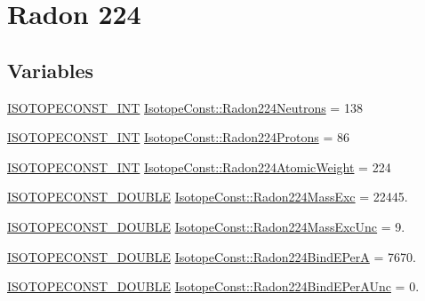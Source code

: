 \hypertarget{group___isotope_const-_radon-_rn224}{}\section{Radon 224}
\label{group___isotope_const-_radon-_rn224}
\subsection*{Variables}
\begin{DoxyCompactItemize}
\item 
\mbox{\hyperlink{group___isotope_const-_macros_ga5f18360b3e99483a35c32d789e62621c}{I\+S\+O\+T\+O\+P\+E\+C\+O\+N\+S\+T\+\_\+\+I\+NT}} \mbox{\hyperlink{group___isotope_const-_radon-_rn224_ga6cb3873adc7e7a927e28786b482a9480}{Isotope\+Const\+::\+Radon224\+Neutrons}} = 138
\item 
\mbox{\hyperlink{group___isotope_const-_macros_ga5f18360b3e99483a35c32d789e62621c}{I\+S\+O\+T\+O\+P\+E\+C\+O\+N\+S\+T\+\_\+\+I\+NT}} \mbox{\hyperlink{group___isotope_const-_radon-_rn224_ga3c0185f2e5d785e3fde9c56ef51a2580}{Isotope\+Const\+::\+Radon224\+Protons}} = 86
\item 
\mbox{\hyperlink{group___isotope_const-_macros_ga5f18360b3e99483a35c32d789e62621c}{I\+S\+O\+T\+O\+P\+E\+C\+O\+N\+S\+T\+\_\+\+I\+NT}} \mbox{\hyperlink{group___isotope_const-_radon-_rn224_gabebc509376c2696899d865a64b8c2c82}{Isotope\+Const\+::\+Radon224\+Atomic\+Weight}} = 224
\item 
\mbox{\hyperlink{group___isotope_const-_macros_ga8f45a7272ce02c0b4c65c44636ed719a}{I\+S\+O\+T\+O\+P\+E\+C\+O\+N\+S\+T\+\_\+\+D\+O\+U\+B\+LE}} \mbox{\hyperlink{group___isotope_const-_radon-_rn224_ga06a47e5067714fcc25ce4bb2b4e84c1e}{Isotope\+Const\+::\+Radon224\+Mass\+Exc}} = 22445.
\item 
\mbox{\hyperlink{group___isotope_const-_macros_ga8f45a7272ce02c0b4c65c44636ed719a}{I\+S\+O\+T\+O\+P\+E\+C\+O\+N\+S\+T\+\_\+\+D\+O\+U\+B\+LE}} \mbox{\hyperlink{group___isotope_const-_radon-_rn224_ga7cdb5f5ee8054f14055c5ce7eebc862f}{Isotope\+Const\+::\+Radon224\+Mass\+Exc\+Unc}} = 9.
\item 
\mbox{\hyperlink{group___isotope_const-_macros_ga8f45a7272ce02c0b4c65c44636ed719a}{I\+S\+O\+T\+O\+P\+E\+C\+O\+N\+S\+T\+\_\+\+D\+O\+U\+B\+LE}} \mbox{\hyperlink{group___isotope_const-_radon-_rn224_ga2b5072f66f8aea3baa366e68bea28885}{Isotope\+Const\+::\+Radon224\+Bind\+E\+PerA}} = 7670.
\item 
\mbox{\hyperlink{group___isotope_const-_macros_ga8f45a7272ce02c0b4c65c44636ed719a}{I\+S\+O\+T\+O\+P\+E\+C\+O\+N\+S\+T\+\_\+\+D\+O\+U\+B\+LE}} \mbox{\hyperlink{group___isotope_const-_radon-_rn224_ga79ac20681e11af6e7318d01de5d0c216}{Isotope\+Const\+::\+Radon224\+Bind\+E\+Per\+A\+Unc}} = 0.

\end{DoxyCompactItemize}
